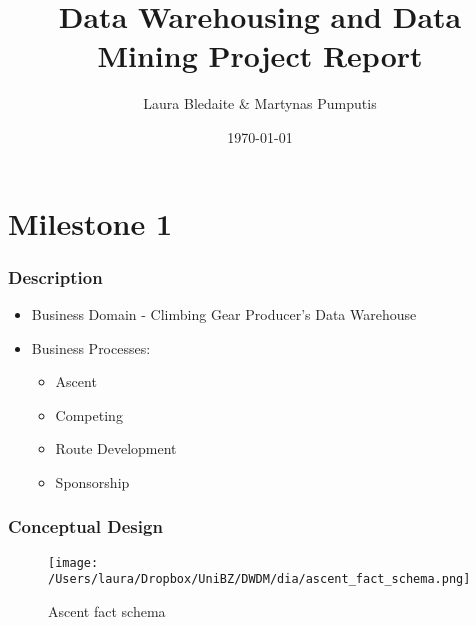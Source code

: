 \documentclass[]{beamer}
\title{Data Warehousing and Data Mining Project Report}    %
\author{Laura Bledaite \& Martynas Pumputis}                 %
\institute{Free University of Bozen - Bolzano}      %
\date{\today}                    %
\begin{document}
\begin{frame}
  \titlepage
\end{frame}

\section[Outline]{}

\begin{frame}
  \tableofcontents
\end{frame}


\section{Milestone 1}

\begin{frame}
  \frametitle{Description}   %

  \begin{itemize}
  \item Business Domain - Climbing Gear Producer's Data Warehouse
  \item Business Processes:
    \begin{itemize}
    \item Ascent
    \item Competing
    \item Route Development
    \item Sponsorship
    \end{itemize}
  \end{itemize}
\end{frame}


\begin{frame}
  \frametitle{Conceptual Design}   %

  \begin{figure}[ht!]
  \centering 
  \texttt{[image: /Users/laura/Dropbox/UniBZ/DWDM/dia/ascent\_fact\_schema.png]}
  \caption{Ascent fact schema}
  \label{fig:ascent_fact_schema}
  \end{figure}

\end{frame}
\end{document}
